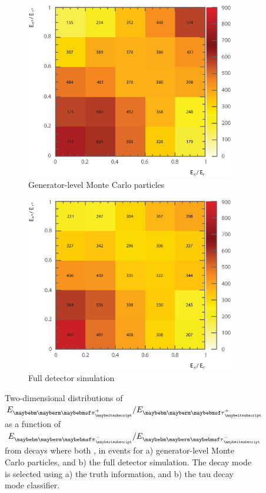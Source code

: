 \begin{figure}[htbp]
\centering %
\begin{subfigure}[b]{0.7\textwidth}
  \includegraphics[width=\textwidth]{tau/NoTimeAnalysis/2DMC2}
  \caption{Generator-level  Monte Carlo particles}
  \label{fig:TauSpin2DMC}
\end{subfigure}
\begin{subfigure}[b]{0.7\textwidth}
  \includegraphics[width=\textwidth]{tau/NoTimeAnalysis/2Dreco2}
  \caption{Full detector simulation}
  \label{fig:TauSpin2Dreco}
\end{subfigure}
\caption
{Two-dimensional distributions of $E_{\Ppiplus}/E_{\APtauon}$ as a function of $E_{\Ppiminus}/E_{\Ptauon}$ from \ZToTauTau decays where both \tauToPionBoth, in \eeZZQQ events for a) generator-level  Monte Carlo particles, and b) the full detector simulation. The \tauToPionBoth decay mode is selected using a) the truth information, and b) the tau decay mode classifier.}
\label{fig:TauSpin2D}
\end{figure}

